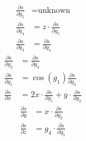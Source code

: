 \begin{multicols}{3}
    \noindent
    \begin{align*}
        \frac{\partial s}{\partial g_5} &= \text{unknown}\\
        \frac{\partial s}{\partial g_4} &= z\cdot\frac{\partial s}{\partial g_5}\\
        \frac{\partial s}{\partial g_3} &= \frac{\partial s}{\partial g_4}
    \end{align*}
    \begin{align*}
        \frac{\partial s}{\partial g_2} &= \frac{\partial s}{\partial g_4} \\
        \frac{\partial s}{\partial g_1} &= \cos(g_1)\frac{\partial s}{\partial g_3}\\
        \frac{\partial s}{\partial x}   &= 2x\cdot\frac{\partial s}{\partial g_1} + y\cdot\frac{\partial s}{\partial g_2}
    \end{align*}
    \begin{align*}
        \frac{\partial s}{\partial y}   &= x\cdot\frac{\partial s}{\partial g_2}\\
        \frac{\partial s}{\partial z}   &= g_4\cdot\frac{\partial s}{\partial g_5}
    \end{align*}
\end{multicols}

